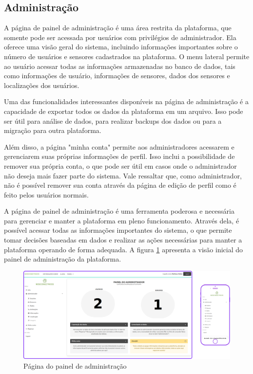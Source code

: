 \documentclass[tcc,capa]{texufpel}
\begin{document}
\subsection{Administração}
A página de painel de administração é uma área restrita da plataforma, que somente pode ser acessada por usuários com privilégios de administrador. Ela oferece uma visão geral do sistema, incluindo informações importantes sobre o número de usuários e sensores cadastrados na plataforma. O menu lateral permite ao usuário acessar todas as informações armazenadas no banco de dados, tais como informações de usuário, informações de sensores, dados dos sensores e localizações dos usuários.

Uma das funcionalidades interessantes disponíveis na página de administração é a capacidade de exportar todos os dados da plataforma em um arquivo. Isso pode ser útil para análise de dados, para realizar backups dos dados ou para a migração para outra plataforma.

Além disso, a página "minha conta" \space permite aos administradores acessarem e gerenciarem suas próprias informações de perfil. Isso inclui a possibilidade de remover sua própria conta, o que pode ser útil em casos onde o administrador não deseja mais fazer parte do sistema. Vale ressaltar que, como administrador, não é possível remover sua conta através da página de edição de perfil como é feito pelos usuários normais.

A página de painel de administração é uma ferramenta poderosa e necessária para gerenciar e manter a plataforma em pleno funcionamento. Através dela, é possível acessar todas as informações importantes do sistema, o que permite tomar decisões baseadas em dados e realizar as ações necessárias para manter a plataforma operando de forma adequada. A figura \ref{painel} apresenta a visão inicial do painel de administração da plataforma.

\begin{figure}[htbp]
  \centering \includegraphics[scale=.2]{assets/painel.png}
  \caption{Página do painel de administração}
  \label{painel}
\end{figure}
\newpage
\end{document}
